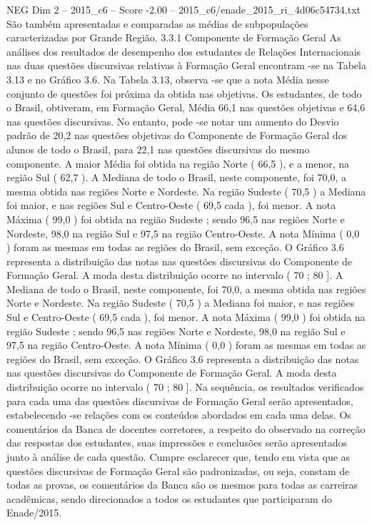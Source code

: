 \begin{textsample}{NEG Dim 2 – 2015\_c6 – Score -2.00 – 2015\_c6/enade\_2015\_ri\_4d06c54734.txt}
São também apresentadas e comparadas as médias de subpopulações caracterizadas por Grande Região. 3.3.1 Componente de Formação Geral As análises dos resultados de desempenho dos estudantes de Relações Internacionais nas duas questões discursivas relativas à Formação Geral encontram -se na Tabela 3.13 e no Gráfico 3.6.
Na Tabela 3.13, observa -se que a nota Média nesse conjunto de questões foi próxima da obtida nas objetivas.
Os estudantes, de todo o Brasil, obtiveram, em Formação Geral, Média 66,1 nas questões objetivas e 64,6 nas questões discursivas.
No entanto, pode -se notar um aumento do Desvio padrão de 20,2 nas questões objetivas do Componente de Formação Geral dos alunos de todo o Brasil, para 22,1 nas questões discursivas do mesmo componente.
A maior Média foi obtida na região Norte ( 66,5 ), e a menor, na região Sul ( 62,7 ).
A Mediana de todo o Brasil, neste componente, foi 70,0, a mesma obtida nas regiões Norte e Nordeste.
Na região Sudeste ( 70,5 ) a Mediana foi maior, e nas regiões Sul e Centro-Oeste ( 69,5 cada ), foi menor.
A nota Máxima ( 99,0 ) foi obtida na região Sudeste ; sendo 96,5 nas regiões Norte e Nordeste, 98,0 na região Sul e 97,5 na região Centro-Oeste.
A nota Mínima ( 0,0 ) foram as mesmas em todas as regiões do Brasil, sem exceção.
O Gráfico 3.6 representa a distribuição das notas nas questões discursivas do Componente de Formação Geral.
A moda desta distribuição ocorre no intervalo ( 70 ; 80 ].
A Mediana de todo o Brasil, neste componente, foi 70,0, a mesma obtida nas regiões Norte e Nordeste.
Na região Sudeste ( 70,5 ) a Mediana foi maior, e nas regiões Sul e Centro-Oeste ( 69,5 cada ), foi menor.
A nota Máxima ( 99,0 ) foi obtida na região Sudeste ; sendo 96,5 nas regiões Norte e Nordeste, 98,0 na região Sul e 97,5 na região Centro-Oeste.
A nota Mínima ( 0,0 ) foram as mesmas em todas as regiões do Brasil, sem exceção.
O Gráfico 3.6 representa a distribuição das notas nas questões discursivas do Componente de Formação Geral.
A moda desta distribuição ocorre no intervalo ( 70 ; 80 ].
Na sequência, os resultados verificados para cada uma das questões discursivas de Formação Geral serão apresentados, estabelecendo -se relações com os conteúdos abordados em cada uma delas.
Os comentários da Banca de docentes corretores, a respeito do observado na correção das respostas dos estudantes, suas impressões e conclusões serão apresentados junto à análise de cada questão.
Cumpre esclarecer que, tendo em vista que as questões discursivas de Formação Geral são padronizadas, ou seja, constam de todas as provas, os comentários da Banca são os mesmos para todas as carreiras acadêmicas, sendo direcionados a todos os estudantes que participaram do Enade/2015.

\end{textsample}
